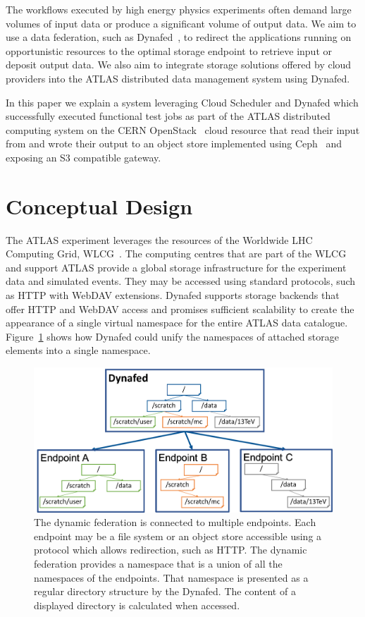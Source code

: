 \documentclass[a4paper]{jpconf}
\begin{document}
The workflows executed by high energy physics experiments often demand large volumes of input data or produce a significant volume of output data. We aim to use a data federation, such as Dynafed~\cite{dynafed}, to redirect the applications running on opportunistic resources to the optimal storage endpoint to retrieve input or deposit output data. We also aim to integrate storage solutions offered by cloud providers into the ATLAS distributed data management system using Dynafed.

In this paper we explain a system leveraging Cloud Scheduler and Dynafed which successfully executed functional test jobs as part of the ATLAS distributed computing system on the CERN OpenStack~\cite{openstack} cloud resource that read their input from and wrote their output to an object store implemented using Ceph~\cite{ceph} and exposing an S3 compatible gateway.

\section{Conceptual Design}
The ATLAS experiment leverages the resources of the Worldwide LHC Computing Grid, WLCG~\cite{wlcg}. The computing centres that are part of the WLCG and support ATLAS provide a global storage infrastructure for the experiment data and simulated events.
They may be accessed using standard protocols, such as HTTP with WebDAV extensions. Dynafed supports storage backends that offer HTTP and WebDAV access and promises sufficient scalability to create the appearance of a single virtual namespace for the entire ATLAS data catalogue.  Figure~\ref{fig:conceptual-design} shows how Dynafed could unify the namespaces of attached storage elements into a single namespace.

\begin{figure}
  \centering
  \includegraphics[width=\textwidth]{conceptual-design.png}
  \caption{The dynamic federation is connected to multiple endpoints. Each endpoint may be a file system or an object store accessible using a protocol which allows redirection, such as HTTP. The dynamic federation provides a namespace that is a union of all the namespaces of the endpoints. That namespace is presented as a regular directory structure by the Dynafed. The content of a displayed directory is calculated when accessed.}
  \label{fig:conceptual-design}
\end{figure}
\end{document}
